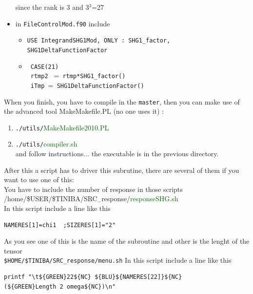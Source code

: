 \documentclass[openany,oneside]{book}
\numberwithin{equation}{section}
\begin{document}
\begin{itemize}
since the rank is 3 and 3$^3$=27

\item in \verb=FileControlMod.f90= include

\begin{itemize}
\item \verb=USE IntegrandSHG1Mod, ONLY : SHG1_factor, SHG1DeltaFunctionFactor=
\item
\verb= CASE(21)=\\
\verb= rtmp2 = =\verb= rtmp*SHG1_factor()=\\
\verb= iTmp ==\verb= SHG1DeltaFunctionFactor()=

\end{itemize}


\end{itemize}        
When you finish, you have to compile in the \verb=master=, then you can make use of the 
advanced tool MakeMakefile.PL (no one uses it) :
\begin{enumerate}
\item \verb=./utils/=\textcolor{darkgreen}{MakeMakefile2010.PL}
\item
  \verb=./utils/=\textcolor{darkgreen}{compiler.sh}\\
and follow instructions$\ldots$ the executable is in the previous directory.
\end{enumerate}



After this a script has to driver this subrutine, there are several of them 
if you want to use one of this:\\
You have to include the number of response in those scripts\\
/home/\$USER/\$TINIBA/SRC$_{-}$response/\textcolor{darkgreen}{responseSHG.sh}\\
In this script include a line like this
\begin{verbatim}
NAMERES[1]=chi1  ;SIZERES[1]="2"
\end{verbatim}
As you see one of this is the name of the subroutine and other is the lenght of the tensor\\ 
\verb=$HOME/$TINIBA/SRC_response/menu.sh=
In this script include a line like this
\begin{verbatim}
printf "\t${GREEN}22${NC} ${BLU}${NAMERES[22]}${NC}  
(${GREEN}Length 2 omega${NC})\n"
\end{verbatim}
\end{document}
